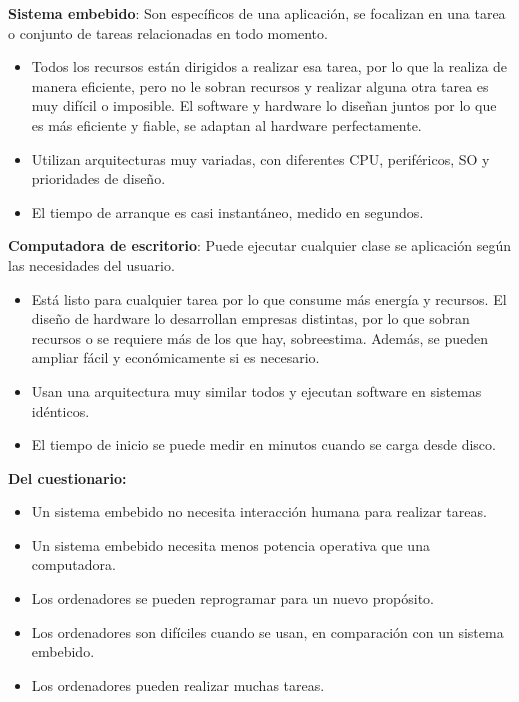 \documentclass[12pt]{report} %
\begin{document}
\textbf{Sistema embebido}: Son específicos de una aplicación, se
focalizan en una tarea o conjunto de tareas relacionadas en todo
momento.

\begin{itemize}

\item
  Todos los recursos están dirigidos a realizar esa tarea, por lo que la
  realiza de manera eficiente, pero no le sobran recursos y realizar alguna otra tarea es
  muy difícil o imposible. El software y hardware lo diseñan juntos por
  lo que es más eficiente y fiable, se adaptan al hardware
  perfectamente.
\item
  Utilizan arquitecturas muy variadas, con diferentes CPU, periféricos,
  SO y prioridades de diseño.
\item
  El tiempo de arranque es casi instantáneo, medido en segundos.
\end{itemize}

\textbf{Computadora de escritorio}: Puede ejecutar cualquier clase se
aplicación según las necesidades del usuario.

\begin{itemize}

\item
  Está listo para cualquier tarea por lo que consume más energía y
  recursos. El diseño de hardware lo desarrollan empresas distintas, por
  lo que sobran recursos o se requiere más de los que hay, sobreestima.
  Además, se pueden ampliar fácil y económicamente si es necesario.
\item
  Usan una arquitectura muy similar todos y ejecutan software en
  sistemas idénticos.
\item
  El tiempo de inicio se puede medir en minutos cuando se carga desde
  disco.
\end{itemize}

\textbf{Del cuestionario:}

\begin{itemize}

\item
  Un sistema embebido no necesita interacción humana para realizar
  tareas.
\item
  Un sistema embebido necesita menos potencia operativa que una
  computadora.
\item
  Los ordenadores se pueden reprogramar para un nuevo propósito.
\item
  Los ordenadores son difíciles cuando se usan, en comparación con un
  sistema embebido.
\item
  Los ordenadores pueden realizar muchas tareas.
\end{itemize}		
\end{document}
